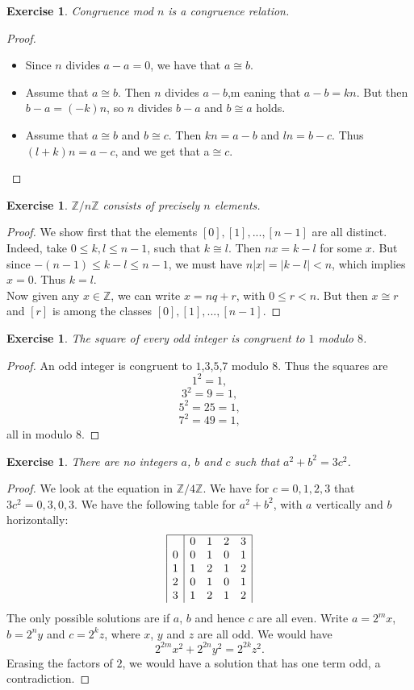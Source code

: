 \documentclass[a4paper, 11pt]{book}
\theoremstyle{plain}
\newtheorem{exercise}[theorem]{Exercise}
\theoremstyle{plain}
\begin{document}
\begin{exercise}
Congruence mod $n$ is a congruence relation.
\end{exercise}
\begin{proof}
\begin{itemize}
    \item Since $n$ divides $a-a=0$, we have that $a\cong b$.
    \item Assume that $a\cong b$. Then $n$ divides $a-b$,m eaning that $a-b=kn$. But then $b-a=(-k)n$, so $n$ divides $b-a$ and $b\cong a$ holds.
    \item Assume that $a\cong b$ and $b\cong c$. Then $kn=a-b$ and $ln=b-c$. Thus $(l+k)n = a-c$, and we get that a$\cong c$.
\end{itemize}
\end{proof}

\begin{exercise}
$\mathbb{Z}/n\mathbb{Z}$ consists of precisely $n$ elements.
\end{exercise}
\begin{proof}
We show first that the elements $[0], [1],..., [n-1]$ are all distinct. Indeed, take $0\leq k,l\leq n-1$, such that $k\cong l$. Then $nx=k-l$ for some $x$. But since $-(n-1)\leq k-l\leq n-1$, we must have $n|x| = |k-l|<n$, which implies $x=0$. Thus $k=l$.\\
Now given any $x\in \mathbb{Z}$, we can write $x=nq + r$, with $0\leq r<n$. But then $x\cong r$ and $[r]$ is among the classes $[0], [1],..., [n-1]$.
\end{proof}

\begin{exercise}
The square of every odd integer is congruent to $1$ modulo $8$.
\end{exercise}
\begin{proof}
An odd integer is congruent to $1$,$3$,$5$,$7$ modulo $8$. Thus the squares are
$$1^2=1,$$
$$3^2=9=1,$$
$$5^2=25=1,$$
$$7^2=49=1,$$
all in modulo $8$.
\end{proof}

\begin{exercise}
There are no integers $a$, $b$ and $c$ such that $a^2+b^2=3c^2$.
\end{exercise}
\begin{proof}
We look at the equation in $\mathbb{Z}/4\mathbb{Z}$. We have for $c=0,1,2,3$ that $3c^2 = 0,3,0,3$.
We have the following table for $a^2+b^2$, with $a$ vertically and $b$ horizontally:
$$\begin{array}{|c|cccc|}
\hline
  & 0 & 1 & 2 & 3 \\
0 & 0 & 1 & 0 & 1 \\
1 & 1 & 2 & 1 & 2 \\
2 & 0 & 1 & 0 & 1 \\
3 & 1 & 2 & 1 & 2
\end{array}$$
The only possible solutions are if $a$, $b$ and hence $c$ are all even. Write $a=2^mx$, $b=2^ny$ and $c=2^k z$, where $x$, $y$ and $z$ are all odd. We would have
$$2^{2m}x^2 + 2^{2n}y^2 = 2^{2k}z^2.$$
Erasing the factors of $2$, we would have a solution that has one term odd, a contradiction.
\end{proof}
\end{document}
